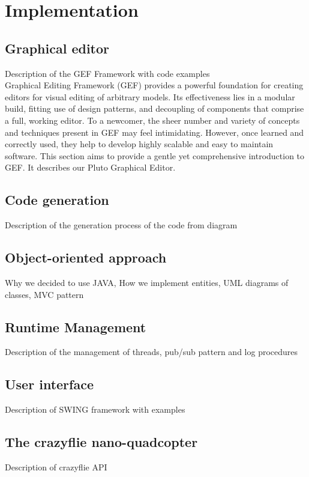 \chapter{Implementation}
\label{cap5}



\section{Graphical editor}\label{editor}

Description of the GEF Framework with code examples
\\
Graphical Editing Framework (GEF) provides a powerful foundation for creating editors for visual editing of arbitrary models. Its effectiveness lies in a modular build, fitting use of design patterns, and decoupling of components that comprise a full, working editor. To a newcomer, the sheer number and variety of concepts and techniques present in GEF may feel intimidating. However, once learned and correctly used, they help to develop highly scalable and easy to maintain software. This section aims to provide a gentle yet comprehensive introduction to GEF. It describes our Pluto Graphical Editor.


\section{Code generation}\label{codeGeneration}

Description of the generation process of the code from diagram

\section{Object-oriented approach}\label{oomodel}

Why we decided to use JAVA, How we implement entities, UML diagrams of classes, MVC pattern

\section{Runtime Management}\label{runtimeMng}

Description of the management of threads, pub/sub pattern and log procedures

\section{User interface}\label{interface}

Description of SWING framework with examples

\section{The crazyflie nano-quadcopter}\label{crazyflie}

Description of crazyflie API 
